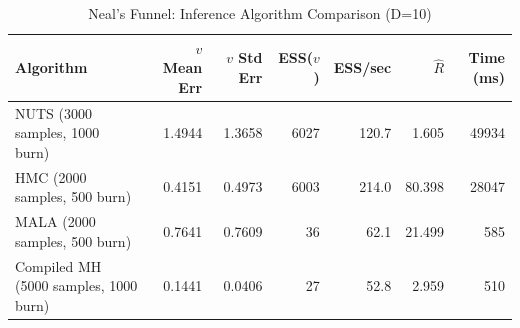 \begin{table}[t]
\centering
\caption{Neal's Funnel: Inference Algorithm Comparison (D=10)}
\label{tab:funnel}
\small
\begin{tabular}{lrrrrrr}
\toprule
Algorithm & $v$ Mean Err & $v$ Std Err & ESS($v$) & ESS/sec & $\hat{R}$ & Time (ms) \\
\midrule
NUTS (3000 samples, 1000 burn) & 1.4944 & 1.3658 & 6027 & 120.7 & 1.605 & 49934 \\
HMC (2000 samples, 500 burn) & 0.4151 & 0.4973 & 6003 & 214.0 & 80.398 & 28047 \\
MALA (2000 samples, 500 burn) & 0.7641 & 0.7609 & 36 & 62.1 & 21.499 & 585 \\
Compiled MH (5000 samples, 1000 burn) & 0.1441 & 0.0406 & 27 & 52.8 & 2.959 & 510 \\
\bottomrule
\end{tabular}
\end{table}